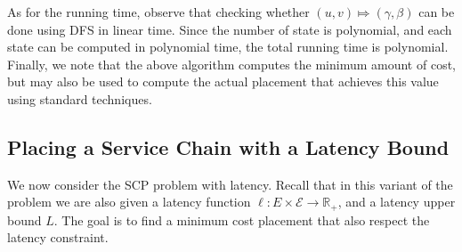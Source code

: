 \documentclass[runningheads]{llncs}
\newcommand{\reals}{\mathbb{R}}
\newcommand{\scp}{\textsc{SCP}\xspace}
\newcommand{\calE}{\mathcal{E}}
\begin{document}
As for the running time, observe that checking whether $(u, v) \Mapsto
(\gamma,\beta)$ can be done using DFS in linear time.
%
Since the number of state is polynomial, and each state can be
computed in polynomial time, the total running time is polynomial.
Finally, we note that the above algorithm computes the minimum amount
of cost, but may also be used to compute the actual placement
that achieves this value using standard techniques.


\subsection{Placing a Service Chain with a Latency Bound}
\label{sub:DPL}

We now consider the \scp problem with latency.  Recall that in this
variant of the problem we are also given a latency function $\ell: E
\times \calE \to \reals_+$, and a latency upper bound $L$.  The goal
is to find a minimum cost placement that also respect the latency
constraint.
\end{document}
